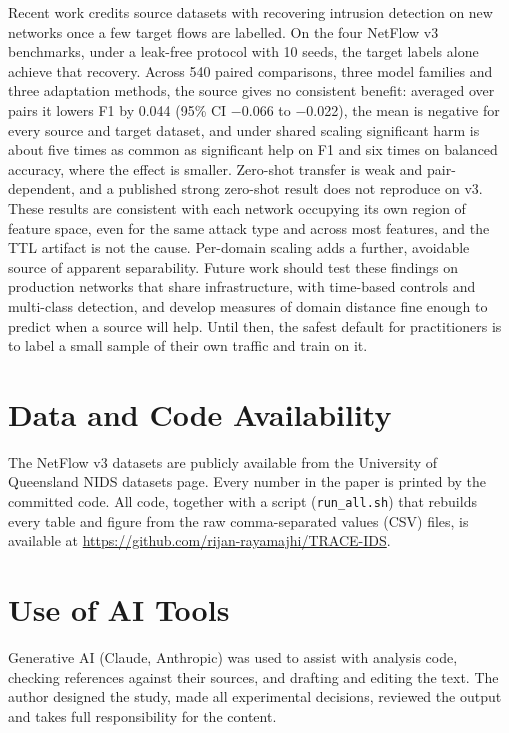 \documentclass[11pt]{article}
\begin{document}
Recent work credits source datasets with recovering intrusion detection on new networks once a few target flows are labelled. On the four NetFlow v3 benchmarks, under a leak-free protocol with 10 seeds, the target labels alone achieve that recovery. Across 540 paired comparisons, three model families and three adaptation methods, the source gives no consistent benefit: averaged over pairs it lowers F1 by 0.044 (95\% CI $-$0.066 to $-$0.022), the mean is negative for every source and target dataset, and under shared scaling significant harm is about five times as common as significant help on F1 and six times on balanced accuracy, where the effect is smaller. Zero-shot transfer is weak and pair-dependent, and a published strong zero-shot result does not reproduce on v3. These results are consistent with each network occupying its own region of feature space, even for the same attack type and across most features, and the TTL artifact is not the cause. Per-domain scaling adds a further, avoidable source of apparent separability. Future work should test these findings on production networks that share infrastructure, with time-based controls and multi-class detection, and develop measures of domain distance fine enough to predict when a source will help. Until then, the safest default for practitioners is to label a small sample of their own traffic and train on it.

\section*{Data and Code Availability}

The NetFlow v3 datasets are publicly available from the University of Queensland NIDS datasets page. Every number in the paper is printed by the committed code. All code, together with a script (\texttt{run\_all.sh}) that rebuilds every table and figure from the raw comma-separated values (CSV) files, is available at \url{https://github.com/rijan-rayamajhi/TRACE-IDS}.

\section*{Use of AI Tools}

Generative AI (Claude, Anthropic) was used to assist with analysis code, checking references against their sources, and drafting and editing the text. The author designed the study, made all experimental decisions, reviewed the output and takes full responsibility for the content.
\end{document}
